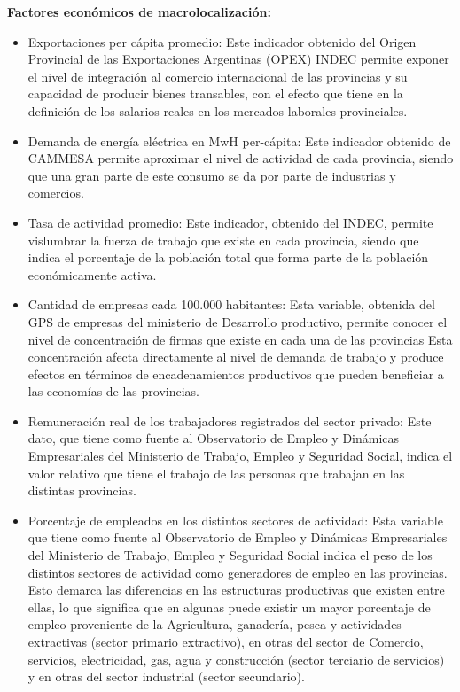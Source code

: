 \documentclass[12pt,a4paper]{article}
\begin{document}
\textbf{Factores económicos de macrolocalización:}
\begin{itemize}
\item Exportaciones per cápita promedio: Este indicador obtenido del Origen Provincial de las Exportaciones Argentinas (OPEX) INDEC permite exponer el nivel de integración al comercio internacional de las provincias y su capacidad de producir bienes transables, con el efecto que tiene en la definición de los salarios reales en los mercados laborales provinciales.

\item Demanda de energía eléctrica en MwH per-cápita: Este indicador obtenido de CAMMESA permite aproximar el nivel de actividad de cada provincia, siendo que una gran parte de este consumo se da por parte de industrias y comercios.

\item Tasa de actividad promedio: Este indicador, obtenido del INDEC, permite vislumbrar la fuerza de trabajo que existe en cada provincia, siendo que indica el porcentaje de la población total que forma parte de la población económicamente activa.

\item Cantidad de empresas cada 100.000 habitantes: Esta variable, obtenida del GPS de empresas del ministerio de Desarrollo productivo, permite conocer el nivel de concentración de firmas que existe en cada una de las provincias Esta concentración afecta directamente al nivel de demanda de trabajo y produce efectos en términos de encadenamientos productivos que pueden beneficiar a las economías de las provincias.

\item Remuneración real de los trabajadores registrados del sector privado: Este dato, que tiene como fuente al Observatorio de Empleo y Dinámicas Empresariales del Ministerio de Trabajo, Empleo y Seguridad Social, indica el valor relativo que tiene el trabajo de las personas que trabajan en las distintas provincias.

\item Porcentaje de empleados en los distintos sectores de actividad: Esta variable que tiene como fuente al Observatorio de Empleo y Dinámicas Empresariales del Ministerio de Trabajo, Empleo y Seguridad Social indica el peso de los distintos sectores de actividad como generadores de empleo en las provincias. Esto demarca las diferencias en las estructuras productivas que existen entre ellas, lo que significa que en algunas puede existir un mayor porcentaje de empleo proveniente de la Agricultura, ganadería, pesca y actividades extractivas (sector primario extractivo), en otras del sector de Comercio, servicios, electricidad, gas, agua y construcción (sector terciario de servicios) y en otras del sector industrial (sector secundario).


\end{itemize}
\end{document}
